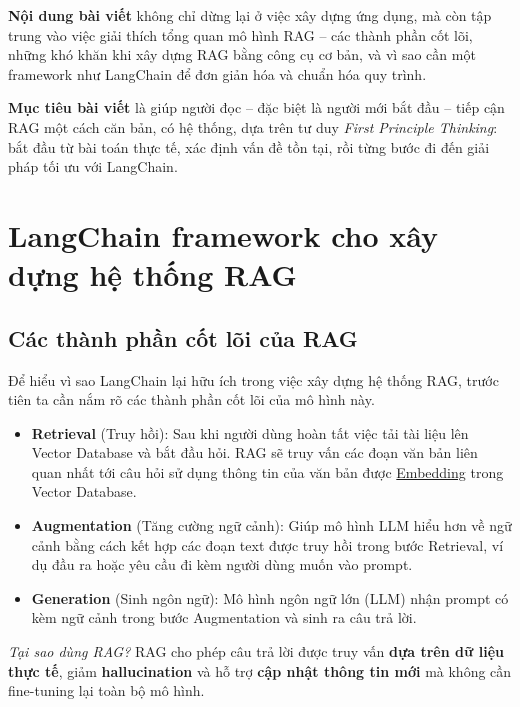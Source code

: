 \documentclass[11pt]{article}
\begin{document}
\vspace{0.5em}
\textbf{Nội dung bài viết} không chỉ dừng lại ở việc xây dựng ứng dụng, mà còn tập trung vào việc giải thích tổng quan mô hình RAG – các thành phần cốt lõi, những khó khăn khi xây dựng RAG bằng công cụ cơ bản, và vì sao cần một framework như LangChain để đơn giản hóa và chuẩn hóa quy trình.

\vspace{0.5em}
\textbf{Mục tiêu bài viết} là giúp người đọc – đặc biệt là người mới bắt đầu – tiếp cận RAG một cách căn bản, có hệ thống, dựa trên tư duy \textit{First Principle Thinking}: bắt đầu từ bài toán thực tế, xác định vấn đề tồn tại, rồi từng bước đi đến giải pháp tối ưu với LangChain.


\section{LangChain framework cho xây dựng hệ thống RAG}
\subsection{Các thành phần cốt lõi của RAG}
Để hiểu vì sao LangChain lại hữu ích trong việc xây dựng hệ thống RAG, trước tiên ta cần nắm rõ các thành phần cốt lõi của mô hình này.

\label{sec:rag_core}
\begin{itemize}
    \item \textbf{Retrieval} (Truy hồi): Sau khi người dùng hoàn tất việc tải tài liệu lên Vector Database và bắt đầu hỏi. RAG sẽ truy vấn các đoạn văn bản liên quan nhất tới câu hỏi sử dụng thông tin của văn bản được \hyperref[app:embedding]{Embedding} trong Vector Database.
    \item \textbf{Augmentation} (Tăng cường ngữ cảnh): Giúp mô hình LLM hiểu hơn về ngữ cảnh bằng cách kết hợp các đoạn text được truy hồi trong bước Retrieval, ví dụ đầu ra hoặc yêu cầu đi kèm người dùng muốn vào prompt.
    \item \textbf{Generation} (Sinh ngôn ngữ): Mô hình ngôn ngữ lớn (LLM) nhận prompt có kèm ngữ cảnh trong bước Augmentation và sinh ra câu trả lời.
\end{itemize}

\vspace{-0.5em}
\noindent
\textit{Tại sao dùng RAG?}
RAG cho phép câu trả lời được truy vấn \textbf{dựa trên dữ liệu thực tế}, giảm \textbf{hallucination} và hỗ trợ \textbf{cập nhật thông tin mới} mà không cần fine-tuning lại toàn bộ mô hình. \\ \\
\end{document}
